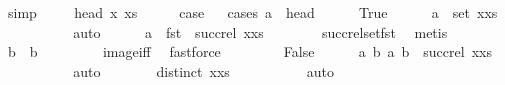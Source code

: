 \begin{isabellebody}
\ simp\isanewline
{}\isamarkupfalse%
\isanewline
\ \ \isamarkupfalse%
\ {\isacharparenleft}{}\ head\ x\ xs{\isacharparenright}\isanewline
\ \ \isamarkupfalse%
\ \isamarkupfalse%
\ {\isacharquery}case\isanewline
\ \ \isamarkupfalse%
{\isacharparenleft}cases\ {\isachardoublequoteopen}a\ {\isacharequal}\ head{\isachardoublequoteclose}{\isacharparenright}\isanewline
\ \ \ \ \isamarkupfalse%
\ True\isanewline
\ \ \ \ \isamarkupfalse%
\ {\isachardoublequoteopen}a\ {\isasymnotin}\ set\ {\isacharparenleft}x{\isacharhash}xs{\isacharparenright}{\isachardoublequoteclose}\isanewline
\ \ \ \ \ \ \isamarkupfalse%
\ {}\ \isamarkupfalse%
\ auto\isanewline
\ \ \ \ \isamarkupfalse%
\ {\isachardoublequoteopen}a\ {\isasymnotin}\ fst\ {\isacharbackquote}\ {\isacharparenleft}succ{\isacharunderscore}rel\ {\isacharparenleft}x{\isacharhash}xs{\isacharparenright}{\isacharparenright}{\isachardoublequoteclose}\isanewline
\ \ \ \ \ \ \isamarkupfalse%
\ succ{\isacharunderscore}rel{\isacharunderscore}set{\isacharunderscore}fst\ \isamarkupfalse%
\ metis\isanewline
\ \ \ \ \isamarkupfalse%
\ \isamarkupfalse%
\ {\isachardoublequoteopen}b{}\ {\isacharequal}\ b{}{\isachardoublequoteclose}\isanewline
\ \ \ \ \ \ \isamarkupfalse%
\ {}\ image{\isacharunderscore}iff\ \isamarkupfalse%
\ fastforce\isanewline
\ \ \isamarkupfalse%
\isanewline
\ \ \ \ \isamarkupfalse%
\ False\isanewline
\ \ \ \ \isamarkupfalse%
\ {\isachardoublequoteopen}{\isacharbraceleft}{\isacharparenleft}a{\isacharcomma}\ b{}{\isacharparenright}{\isacharcomma}\ {\isacharparenleft}a{\isacharcomma}\ b{}{\isacharparenright}{\isacharbraceright}\ {\isasymsubseteq}\ succ{\isacharunderscore}rel\ {\isacharparenleft}x{\isacharhash}xs{\isacharparenright}{\isachardoublequoteclose}\isanewline
\ \ \ \ \ \ \isamarkupfalse%
\ {}\ \isamarkupfalse%
\ auto\isanewline
\ \ \ \ \isamarkupfalse%
\ \isamarkupfalse%
\ {\isachardoublequoteopen}distinct\ {\isacharparenleft}x{\isacharhash}xs{\isacharparenright}{\isachardoublequoteclose}\isanewline
\ \ \ \ \ \ \isamarkupfalse%
\ {}\ \isamarkupfalse%
\ auto\isanewline
\ \ \ \ \isamarkupfalse%

\end{isabellebody}
